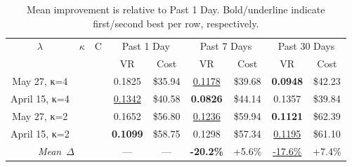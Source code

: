 \documentclass{article}
\begin{document}
\begin{table}[t]
\centering
\footnotesize
\setlength{\tabcolsep}{2.5pt}
\caption{Mean improvement is relative to Past 1 Day. Bold/underline indicate first/second best per row, respectively.}\label{tab:todo}
\begin{tabular}{c c c || c c | c c | c c}
\toprule
$\lambda$ & $\kappa$ & C & \multicolumn{2}{c|}{Past 1 Day} & \multicolumn{2}{c|}{Past 7 Days} & \multicolumn{2}{c}{Past 30 Days} \\
 &  &  & VR & Cost & VR & Cost & VR & Cost \\
\hline
May 27, κ=4 &  &  & 0.1825 & \$35.94 & \underline{0.1178} & \$39.68 & \textbf{0.0948} & \$42.23 \\
April 15, κ=4 &  &  & \underline{0.1342} & \$40.58 & \textbf{0.0826} & \$44.14 & 0.1357 & \$39.84 \\
May 27, κ=2 &  &  & 0.1652 & \$56.80 & \underline{0.1236} & \$59.94 & \textbf{0.1121} & \$62.39 \\
April 15, κ=2 &  &  & \textbf{0.1099} & \$58.75 & 0.1298 & \$57.34 & \underline{0.1195} & \$61.10 \\
\hline
\multicolumn{3}{c||}{\textit{Mean~$\Delta$}} & --- & --- & \textbf{-20.2\%} & +5.6\% & \underline{-17.6\%} & +7.4\% \\
\bottomrule
\end{tabular}
\end{table}
\end{document}
